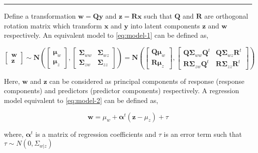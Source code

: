\documentclass[12pt,3p,authoryear]{elsarticle}
\begin{document}
\begin{center}\rule{0.5\linewidth}{\linethickness}\end{center}

Define a transformation \(\mathbf{w} = \mathbf{Qy}\) and
\(\mathbf{z} = \mathbf{Rx}\) such that \(\mathbf{Q}\) and \(\mathbf{R}\)
are orthogonal rotation matrix which transform \(\mathbf{x}\) and
\(\mathbf{y}\) into latent components \(\mathbf{z}\) and \(\mathbf{w}\)
respectively. An equivalent model to \eqref{eq:model-1} can be defined as,

\begin{equation}
  \begin{bmatrix}
    \mathbf{w} \\ \mathbf{z}
  \end{bmatrix} \sim \mathbf{N}
  \left(
    \begin{bmatrix}
      \boldsymbol{\mu}_w \\
      \boldsymbol{\mu}_z
    \end{bmatrix},
    \begin{bmatrix}
    \boldsymbol{\Sigma}_{ww} & \boldsymbol{\Sigma}_{wz} \\
    \boldsymbol{\Sigma}_{zw} & \boldsymbol{\Sigma}_{zz}
    \end{bmatrix}
  \right) = \mathbf{N}
  \left(
    \begin{bmatrix}
      \mathbf{Q}\boldsymbol{\mu}_w \\
      \mathbf{R}\boldsymbol{\mu}_z
    \end{bmatrix},
    \begin{bmatrix}
    \mathbf{Q}\boldsymbol{\Sigma}_{ww}\mathbf{Q}^t & \mathbf{Q}\boldsymbol{\Sigma}_{wz}\mathbf{R}^t \\
    \mathbf{R}\boldsymbol{\Sigma}_{zw}\mathbf{Q}^t & \mathbf{R}\boldsymbol{\Sigma}_{zz}\mathbf{R}^t
    \end{bmatrix}
  \right)
  \label{eq:model-2}
\end{equation}

Here, \(\mathbf{w}\) and \(\mathbf{z}\) can be considered as principal
components of response (response components) and predictors (predictor
components) respectively. A regression model equivalent to
\eqref{eq:model-2} can be defined as,

\begin{equation}
\mathbf{w} = \mu_w + \boldsymbol{\alpha}^t(\mathbf{z} - \mu_z) + \tau
\label{eq:reg-model-2}
\end{equation}

where, \(\boldsymbol{\alpha}^t\) is a matrix of regression coefficients
and \(\tau\) is an error term such that \(\tau \sim N(0, \Sigma_{w|z})\)
\end{document}
